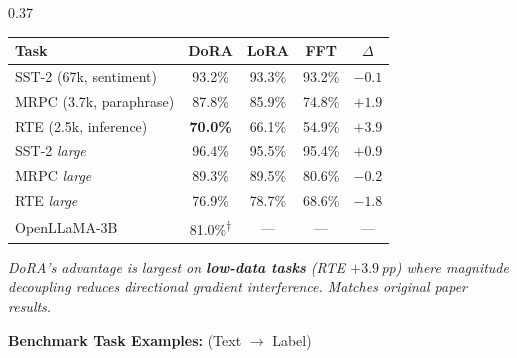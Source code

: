 \documentclass[final]{beamer}
\newcommand{\hl}[1]{\textcolor{CornellRed}{\textbf{#1}}}
\newcommand{\lb}[1]{\textbf{#1:}\;}
\begin{document}
\begin{frame}[t]
\begin{columns}[T,totalwidth=\textwidth]
\begin{column}{0.37\textwidth}
\begin{tcolorbox}[posterblock,title=NLP Results]
				\vspace{0.2cm}
				\begin{center}\small
					\begin{tabular}{@{}lcccc@{}}
						\toprule
						\textbf{Task}           & \textbf{DoRA}                     & \textbf{LoRA} & \textbf{FFT} & $\Delta$    \\
						\midrule
						SST-2 (67k, sentiment)  & 93.2\%                            & 93.3\%        & 93.2\%       & $-0.1$      \\
						MRPC (3.7k, paraphrase) & 87.8\%                            & 85.9\%        & 74.8\%       & $+1.9$      \\
						\rowcolor{TableShade}
						RTE (2.5k, inference)   & \textbf{70.0\%}                   & 66.1\%        & 54.9\%       & $\bm{+3.9}$ \\
						\midrule
						SST-2 \textit{large}    & 96.4\%                            & 95.5\%        & 95.4\%       & $+0.9$      \\
						MRPC \textit{large}     & 89.3\%                            & 89.5\%        & 80.6\%       & $-0.2$      \\
						RTE  \textit{large}     & 76.9\%                            & 78.7\%        & 68.6\%       & $-1.8$      \\
						\midrule
						OpenLLaMA-3B            & 81.0\%\textsuperscript{$\dagger$} & ---           & ---          & ---         \\
						\bottomrule
					\end{tabular}
				\end{center}

				\vspace{0.15cm}
				\small\textit{DoRA's advantage is largest on \hl{low-data tasks}
					(RTE $+3.9$\,pp) where magnitude decoupling reduces directional
					gradient interference.  Matches original paper results.}

				\vspace{0.65cm}
				\lb{Benchmark Task Examples} (Text $\rightarrow$ Label)


\end{tcolorbox}
\end{column}
\end{columns}
\end{frame}
\end{document}
